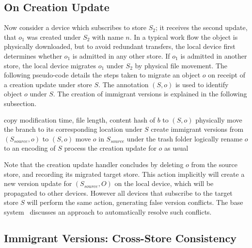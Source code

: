 \subsection*{On Creation Update}

Now consider a device which subscribes to store $S_2$; it receives the second
update, that $o_1$ was created under $S_2$ with name $n$. In a typical work
flow the object is physically downloaded, but to avoid redundant transfers,
the local device first determines whether $o_1$ is admitted in any other
store. If $o_1$ is admitted in another store, the local device migrates
$o_1$ under $S_2$ by physical file movement. The following pseudo-code
details the steps taken to migrate an object $o$ on receipt of a creation
update under store $S$. The annotation $(S,o)$ is used to identify object $o$
under $S$. The creation of immigrant versions is explained in the following
subsection.
\begin{algorithmic}
        \State copy modification time, file length, content hash of $b$
               to $(S,o)$
        \State physically move the branch to its corresponding location
                under $S$
    \EndFor
    \State create immigrant versions from $(S_{source},o)$ to $(S,o)$
    \State move $o$ in $S_{source}$ under the trash folder
    \State logically rename $o$ to an encoding of $S$
\Else
    \State process the creation update for $o$ as usual
\EndIf
\EndFunction
\end{algorithmic}

Note that the creation update handler concludes by deleting $o$ from the source
store, and recording its migrated target store. This action implicitly will
create a new version update for $(S_{source},O)$ on the local device, which will
be propagated to other devices. However all devices that subscribe to the target
store $S$ will perform the same action, generating false version conflicts. The
base system~\cite{wang:patent2012} discusses an approach to automatically
resolve such conflicts.

\subsection*{Immigrant Versions: Cross-Store Consistency}

